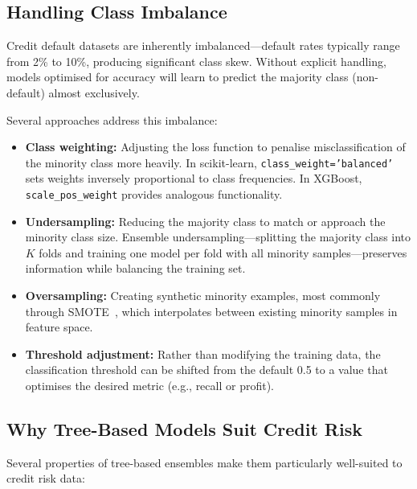 \subsection{Handling Class Imbalance}

Credit default datasets are inherently imbalanced---default rates typically range from 2\% to 10\%, producing significant class skew. Without explicit handling, models optimised for accuracy will learn to predict the majority class (non-default) almost exclusively.

Several approaches address this imbalance:

\begin{itemize}
    \item \textbf{Class weighting:} Adjusting the loss function to penalise misclassification of the minority class more heavily. In scikit-learn, \texttt{class\_weight='balanced'} sets weights inversely proportional to class frequencies. In XGBoost, \texttt{scale\_pos\_weight} provides analogous functionality.
    \item \textbf{Undersampling:} Reducing the majority class to match or approach the minority class size. Ensemble undersampling---splitting the majority class into $K$ folds and training one model per fold with all minority samples---preserves information while balancing the training set.
    \item \textbf{Oversampling:} Creating synthetic minority examples, most commonly through SMOTE~\cite{chawla2002}, which interpolates between existing minority samples in feature space.
    \item \textbf{Threshold adjustment:} Rather than modifying the training data, the classification threshold can be shifted from the default 0.5 to a value that optimises the desired metric (e.g., recall or profit).
\end{itemize}

\subsection{Why Tree-Based Models Suit Credit Risk}

Several properties of tree-based ensembles make them particularly well-suited to credit risk data:


